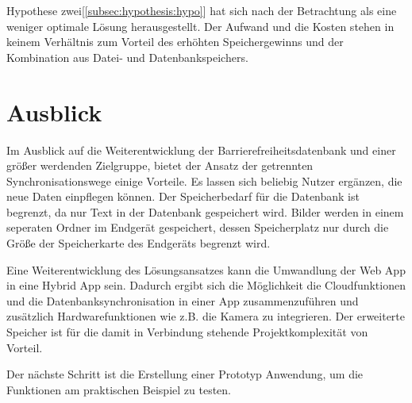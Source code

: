 Hypothese zwei[\ref{subsec:hypothesis:hypo}] hat sich nach der Betrachtung als eine weniger optimale Lösung herausgestellt. Der Aufwand und die Kosten stehen in keinem Verhältnis zum Vorteil des erhöhten Speichergewinns und der Kombination aus Datei- und Datenbankspeichers.

\section{Ausblick}
\label{sec:Fazit:Ausblick}

Im Ausblick auf die Weiterentwicklung der Barrierefreiheitsdatenbank und einer größer werdenden Zielgruppe, bietet der Ansatz der getrennten Synchronisationswege einige Vorteile. Es lassen sich beliebig Nutzer ergänzen, die neue Daten einpflegen können. Der Speicherbedarf für die Datenbank ist begrenzt, da nur Text in der Datenbank gespeichert wird. Bilder werden in einem seperaten Ordner im Endgerät gespeichert, dessen Speicherplatz nur durch die Größe der Speicherkarte des Endgeräts begrenzt wird.

Eine Weiterentwicklung des Lösungsansatzes kann die Umwandlung der Web App in eine Hybrid App sein. Dadurch ergibt sich die Möglichkeit die Cloudfunktionen und die Datenbanksynchronisation in einer App zusammenzuführen und zusätzlich Hardwarefunktionen wie z.B. die Kamera zu integrieren. Der erweiterte Speicher ist für die damit in Verbindung stehende Projektkomplexität von Vorteil.

Der nächste Schritt ist die Erstellung einer Prototyp Anwendung, um die Funktionen am praktischen Beispiel zu testen.
